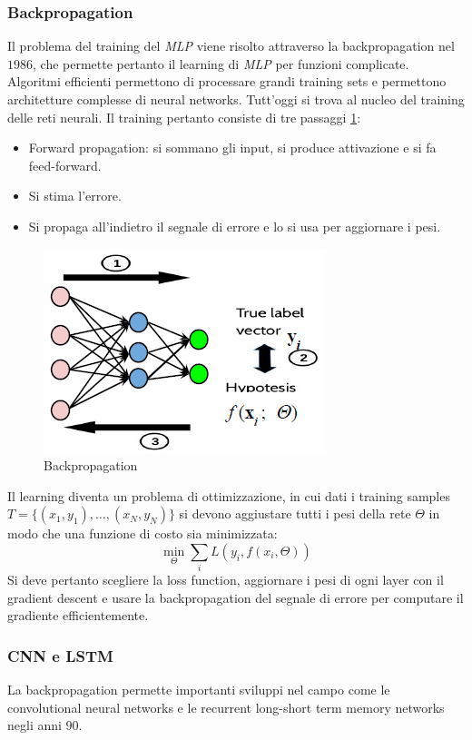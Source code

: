 		\subsubsection{Backpropagation}
		Il problema del training del \emph{MLP} viene risolto attraverso la backpropagation nel $1986$, che permette pertanto il learning di \emph{MLP} per funzioni complicate.
		Algoritmi efficienti permettono di processare grandi training sets e permettono architetture complesse di neural networks.
		Tutt'oggi si trova al nucleo del training delle reti neurali.
		Il training pertanto consiste di tre passaggi \ref{fig:chapter11-03}:
		\begin{multicols}{2}
			\begin{itemize}
				\item Forward propagation: si sommano gli input, si produce attivazione e si fa feed-forward.
				\item Si stima l'errore.
				\item Si propaga all'indietro il segnale di errore e lo si usa per aggiornare i pesi.
			\end{itemize}
		\end{multicols}
		
		\begin{figure}
			\centering
			\includegraphics[width=0.4\linewidth]{imgs/chapter11/img3}
			\caption{Backpropagation}
			\label{fig:chapter11-03}
		\end{figure}
		
		Il learning diventa un problema di ottimizzazione, in cui dati i training samples $T=\{(x_1,y_1),\dots,(x_N,y_N)\}$ si devono aggiustare tutti i pesi della rete $\Theta$ in modo che una funzione di costo sia minimizzata:
		$$\min_\Theta\sum\limits_i L(y_i, f(x_i,\Theta))$$
		Si deve pertanto scegliere la loss function, aggiornare i pesi di ogni layer con il gradient descent e usare la backpropagation del segnale di errore per computare il gradiente efficientemente.

		\subsubsection{CNN e LSTM}
		La backpropagation permette importanti sviluppi nel campo come le convolutional neural networks e le recurrent long-short term memory networks negli anni $90$.

